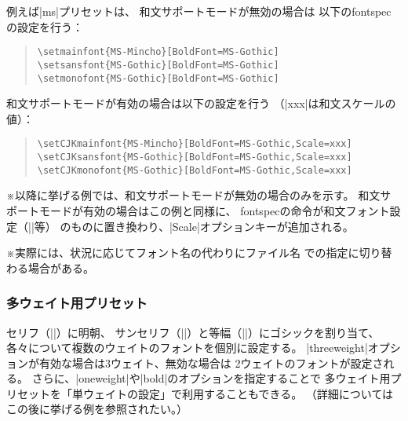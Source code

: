 \documentclass[xelatex,ja=standard,jafont=haranoaji,
  a4paper]{bxjsarticle}
\newcommand{\Pkg}[1]{\textsf{#1}}
\newcommand{\Note}{\par\noindent ※}
\begin{document}
例えば|ms|プリセットは、
和文サポートモードが無効の場合は
以下の\Pkg{fontspec}の設定を行う：
\begin{quote}\small\begin{verbatim}
\setmainfont{MS-Mincho}[BoldFont=MS-Gothic]
\setsansfont{MS-Gothic}[BoldFont=MS-Gothic]
\setmonofont{MS-Gothic}[BoldFont=MS-Gothic]
\end{verbatim}\end{quote}
和文サポートモードが有効の場合は以下の設定を行う
（|xxx|は和文スケールの値）：
\begin{quote}\small\begin{verbatim}
\setCJKmainfont{MS-Mincho}[BoldFont=MS-Gothic,Scale=xxx]
\setCJKsansfont{MS-Gothic}[BoldFont=MS-Gothic,Scale=xxx]
\setCJKmonofont{MS-Gothic}[BoldFont=MS-Gothic,Scale=xxx]
\end{verbatim}\end{quote}
\Note 以降に挙げる例では、和文サポートモードが無効の場合のみを示す。
和文サポートモードが有効の場合はこの例と同様に、%
\Pkg{fontspec}の命令が和文フォント設定（|\setCJKmainfont|等）%
のものに置き換わり、|Scale|オプションキーが追加される。
\Note 実際には、状況に応じてフォント名の代わりにファイル名%
での指定に切り替わる場合がある。

\subsubsection{多ウェイト用プリセット}

セリフ（|\rmfamily|）に明朝、
サンセリフ（|\sffamily|）と等幅（|\ttfamily|）にゴシックを割り当て、
各々について複数のウェイトのフォントを個別に設定する。
|threeweight|オプションが有効な場合は3ウェイト、無効な場合は%
2ウェイトのフォントが設定される。
さらに、|oneweight|や|bold|のオプションを指定することで
多ウェイト用プリセットを「単ウェイトの設定」で利用することもできる。
（詳細についてはこの後に挙げる例を参照されたい。）
\end{document}
